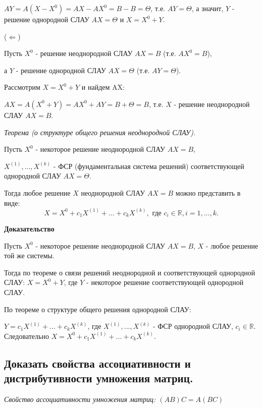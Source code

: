 $AY = A(X - X^0) = AX - AX^0 = B - B = \Theta$, т.е. $AY = \Theta$, а значит, $Y$ - решение однородной СЛАУ $AX = \Theta$ и $X = X^0 + Y$.

\vspace*{15pt}

($\Leftarrow$)  

Пусть $X^0$ - решение неоднородной СЛАУ $AX = B$ (т.е. $AX^0 = B$),

а $Y$ - решение однородной СЛАУ $AX = \Theta$ (т.е. $AY = \Theta$).

Рассмотрим $X = X^0 + Y$ и найдем AX:

$AX = A(X^0 + Y) = AX^0 + AY = B + \Theta = B$, т.е. $X$ - решение неоднородной СЛАУ $AX = B$.  

\ep


\textit {Теорема (о структуре общего решения неоднородной СЛАУ).} 

\vspace*{15pt}

Пусть $X^0$ - некоторое решение неоднородной СЛАУ $AX = B$,

$X^{(1)}, ..., X^{(k)}$ - ФСР (фундаментальная система решений) соответствующей однородной СЛАУ $AX = \Theta$.

Тогда любое решение $X$ неоднородной СЛАУ $AX = B$ можно представить в виде:
$$X = X^0 + c_1X^{(1)} + ... + c_kX^{(k)}, \text{ где } c_i \in \mathbb{R}, i = 1, ..., k.$$

{\bf {Доказательство}}

Пусть $X^0$ - некоторое решение неоднородной СЛАУ $AX = B$, $X$ - любое решение той же системы.

Тогда по теореме о связи решений неоднородной и соответствующей однородной СЛАУ:
$X = X^0 + Y$, где $Y$ - некоторое решение соответствующей однородной СЛАУ.

По теореме о структуре общего решения однородной СЛАУ:

$Y = c_1X^{(1)} + ... +  c_kX^{(k)}$, где $X^{(1)}, ..., X^{(k)}$ - ФСР однородной СЛАУ, $c_i \in \mathbb{R}$. Следовательно $X = X^0 + c_1X^{(1)} + ... + c_kX^{(k)}$.  

\ep

\subsection{Доказать свойства ассоциативности и дистрибутивности умножения матриц. }

\textit {Свойство ассоциативности умножения матриц: $(AB)C = A(BC)$}

